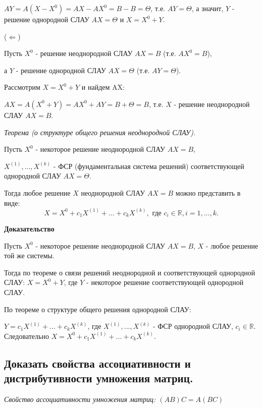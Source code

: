 $AY = A(X - X^0) = AX - AX^0 = B - B = \Theta$, т.е. $AY = \Theta$, а значит, $Y$ - решение однородной СЛАУ $AX = \Theta$ и $X = X^0 + Y$.

\vspace*{15pt}

($\Leftarrow$)  

Пусть $X^0$ - решение неоднородной СЛАУ $AX = B$ (т.е. $AX^0 = B$),

а $Y$ - решение однородной СЛАУ $AX = \Theta$ (т.е. $AY = \Theta$).

Рассмотрим $X = X^0 + Y$ и найдем AX:

$AX = A(X^0 + Y) = AX^0 + AY = B + \Theta = B$, т.е. $X$ - решение неоднородной СЛАУ $AX = B$.  

\ep


\textit {Теорема (о структуре общего решения неоднородной СЛАУ).} 

\vspace*{15pt}

Пусть $X^0$ - некоторое решение неоднородной СЛАУ $AX = B$,

$X^{(1)}, ..., X^{(k)}$ - ФСР (фундаментальная система решений) соответствующей однородной СЛАУ $AX = \Theta$.

Тогда любое решение $X$ неоднородной СЛАУ $AX = B$ можно представить в виде:
$$X = X^0 + c_1X^{(1)} + ... + c_kX^{(k)}, \text{ где } c_i \in \mathbb{R}, i = 1, ..., k.$$

{\bf {Доказательство}}

Пусть $X^0$ - некоторое решение неоднородной СЛАУ $AX = B$, $X$ - любое решение той же системы.

Тогда по теореме о связи решений неоднородной и соответствующей однородной СЛАУ:
$X = X^0 + Y$, где $Y$ - некоторое решение соответствующей однородной СЛАУ.

По теореме о структуре общего решения однородной СЛАУ:

$Y = c_1X^{(1)} + ... +  c_kX^{(k)}$, где $X^{(1)}, ..., X^{(k)}$ - ФСР однородной СЛАУ, $c_i \in \mathbb{R}$. Следовательно $X = X^0 + c_1X^{(1)} + ... + c_kX^{(k)}$.  

\ep

\subsection{Доказать свойства ассоциативности и дистрибутивности умножения матриц. }

\textit {Свойство ассоциативности умножения матриц: $(AB)C = A(BC)$}

